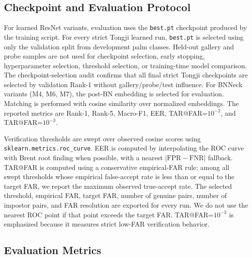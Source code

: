 \subsection{Checkpoint and Evaluation Protocol}

For learned ResNet variants, evaluation uses the \texttt{best.pt} checkpoint produced by the training script. For every strict Tongji learned run, \texttt{best.pt} is selected using only the validation split from development palm classes. Held-out gallery and probe samples are not used for checkpoint selection, early stopping, hyperparameter selection, threshold selection, or training-time model comparison. The checkpoint-selection audit confirms that all final strict Tongji checkpoints are selected by validation Rank-1 without gallery/probe/test influence. For BNNeck variants (M4, M6, M7), the post-BN embedding is selected for evaluation. Matching is performed with cosine similarity over normalized embeddings. The reported metrics are Rank-1, Rank-5, Macro-F1, EER, TAR@FAR=$10^{-2}$, and TAR@FAR=$10^{-3}$.

Verification thresholds are swept over observed cosine scores using \texttt{sklearn.metrics.roc\_curve}. EER is computed by interpolating the ROC curve with Brent root finding when possible, with a nearest $|\mathrm{FPR}-\mathrm{FNR}|$ fallback. TAR@FAR is computed using a conservative empirical-FAR rule: among all swept thresholds whose empirical false-accept rate is less than or equal to the target FAR, we report the maximum observed true-accept rate. The selected threshold, empirical FAR, target FAR, number of genuine pairs, number of impostor pairs, and FAR resolution are exported for every run. We do not use the nearest ROC point if that point exceeds the target FAR. TAR@FAR=$10^{-3}$ is emphasized because it measures strict low-FAR verification behavior.

\subsection{Evaluation Metrics}

